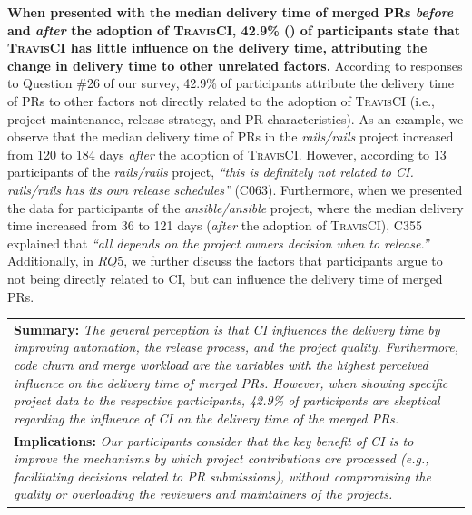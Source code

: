 \vspace{06.mm}
\noindent\textbf{When presented with the median delivery time of merged PRs \textit{before} and \textit{after} the adoption of \textsc{TravisCI}, 42.9\% () of participants state that \textsc{TravisCI} has little influence on the delivery time, attributing the change
in delivery time to other unrelated factors.} 
According to responses to Question \#26 of our survey, 
42.9\% of participants attribute the delivery time of PRs to other factors not directly related to the adoption of \textsc{TravisCI} (i.e., project maintenance, release strategy, and PR characteristics).
As an example, we observe that the median delivery time of PRs in the \textit{rails/rails} project increased from 120 to 184 days \textit{after} the adoption of \textsc{TravisCI}. However, according to 13 participants of the \textit{rails/rails} project, \textit{``this is definitely not related to CI. \textit{rails/rails} has its own release schedules''} (C063). Furthermore, when we presented the data for participants of the \textit{ansible/ansible} project, where the median delivery time increased from 36 to 121 days (\textit{after} the adoption of \textsc{TravisCI}), C355 explained that \textit{``all depends on the project owners decision when to release.''} Additionally, in $RQ5$, we further discuss the factors that participants argue to not being directly related to CI, but can influence the delivery time of merged PRs.

\begin{center}
    \begin{tabular}{|p{}|}
        \hline
        \textbf{Summary:}
        \textit{The general perception is that CI influences the delivery time by improving \textit{automation}, the \textit{release process}, and the \textit{project quality}. Furthermore, \textit{code churn} and \textit{merge workload} are the variables with the highest perceived influence on the delivery time of merged PRs.  
        However, when showing specific project data to the respective participants, 42.9\% of participants are skeptical regarding the influence of CI on the delivery time of the merged PRs.} \\
        \textbf{Implications:}
        \textit{Our participants consider that the key benefit of CI is to improve the mechanisms by which project contributions are processed (e.g., facilitating decisions related to PR submissions), without compromising the quality or overloading the reviewers and maintainers of the projects.}
        \\
        \hline
    \end{tabular}
\end{center}
